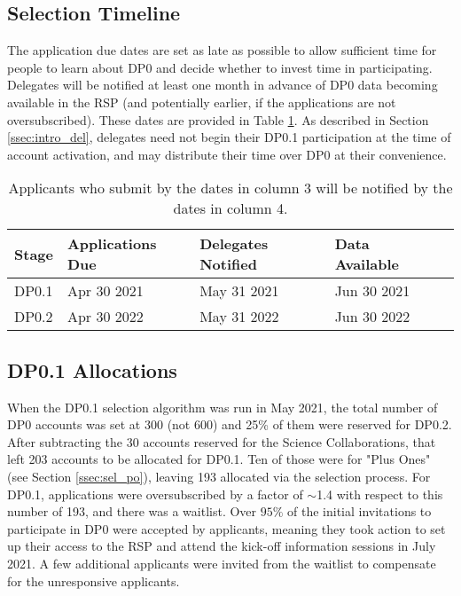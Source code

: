 \documentclass[DM,lsstdraft,authoryear,toc]{lsstdoc}
\begin{document}
\subsection{Selection Timeline}\label{ssec:sel_time}

The application due dates are set as late as possible to allow sufficient time for people to learn about DP0 and decide whether to invest time in participating.
Delegates will be notified at least one month in advance of DP0 data becoming available in the RSP (and potentially earlier, if the applications are not oversubscribed).
These dates are provided in Table \ref{tab:selection_timeline}.
As described in Section \ref{ssec:intro_del}, delegates need not begin their DP0.1 participation at the time of account activation, and may distribute their time over DP0 at their convenience.

\begin{table}[!h]
\centering
\caption{Applicants who submit by the dates in column 3 will be notified by the dates in column 4.}\label{tab:selection_timeline}
\begin{tabular}{lllll}
\hline
Stage & Applications Due & Delegates Notified & Data Available \\
\hline \hline
DP0.1 & Apr 30 2021   &  May 31 2021  &  Jun 30 2021 \\
DP0.2 & Apr 30 2022   &  May 31 2022  &  Jun 30 2022 \\
\hline
\end{tabular}
\end{table}


\subsection{DP0.1 Allocations}\label{ssec:sel_dp01}

When the DP0.1 selection algorithm was run in May 2021, the total number of DP0 accounts was set at 300 (not 600) and 25\% of them were reserved for DP0.2.
After subtracting the 30 accounts reserved for the Science Collaborations, that left 203 accounts to be allocated for DP0.1.
Ten of those were for "Plus Ones" (see Section \ref{ssec:sel_po}), leaving 193 allocated via the selection process.
For DP0.1, applications were oversubscribed by a factor of $\sim$1.4 with respect to this number of 193, and there was a waitlist.
Over $95\%$ of the initial invitations to participate in DP0 were accepted by applicants, meaning they took action to set up their access to the RSP and attend the kick-off information sessions in July 2021. 
A few additional applicants were invited from the waitlist to compensate for the unresponsive applicants. 
\end{document}
